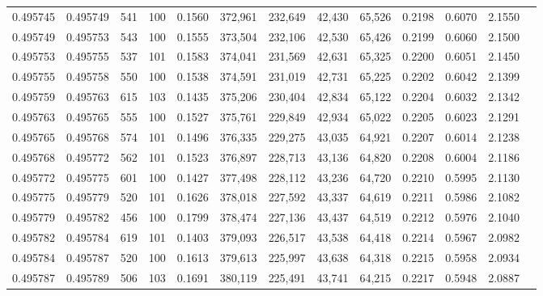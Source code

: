 \begin{tabular}{rrrrrrrrrrrrr}
0.495745 & 0.495749 &   541 & 100 &                                     0.1560 & 372,961 & 232,649 &  42,430 &  65,526 & 0.2198 & 0.6070 & 2.1550 \\
0.495749 & 0.495753 &   543 & 100 &                                     0.1555 & 373,504 & 232,106 &  42,530 &  65,426 & 0.2199 & 0.6060 & 2.1500 \\
0.495753 & 0.495755 &   537 & 101 &                                     0.1583 & 374,041 & 231,569 &  42,631 &  65,325 & 0.2200 & 0.6051 & 2.1450 \\
0.495755 & 0.495758 &   550 & 100 &                                     0.1538 & 374,591 & 231,019 &  42,731 &  65,225 & 0.2202 & 0.6042 & 2.1399 \\
0.495759 & 0.495763 &   615 & 103 &                                     0.1435 & 375,206 & 230,404 &  42,834 &  65,122 & 0.2204 & 0.6032 & 2.1342 \\
0.495763 & 0.495765 &   555 & 100 &                                     0.1527 & 375,761 & 229,849 &  42,934 &  65,022 & 0.2205 & 0.6023 & 2.1291 \\
0.495765 & 0.495768 &   574 & 101 &                                     0.1496 & 376,335 & 229,275 &  43,035 &  64,921 & 0.2207 & 0.6014 & 2.1238 \\
0.495768 & 0.495772 &   562 & 101 &                                     0.1523 & 376,897 & 228,713 &  43,136 &  64,820 & 0.2208 & 0.6004 & 2.1186 \\
0.495772 & 0.495775 &   601 & 100 &                                     0.1427 & 377,498 & 228,112 &  43,236 &  64,720 & 0.2210 & 0.5995 & 2.1130 \\
0.495775 & 0.495779 &   520 & 101 &                                     0.1626 & 378,018 & 227,592 &  43,337 &  64,619 & 0.2211 & 0.5986 & 2.1082 \\
0.495779 & 0.495782 &   456 & 100 &                                     0.1799 & 378,474 & 227,136 &  43,437 &  64,519 & 0.2212 & 0.5976 & 2.1040 \\
0.495782 & 0.495784 &   619 & 101 &                                     0.1403 & 379,093 & 226,517 &  43,538 &  64,418 & 0.2214 & 0.5967 & 2.0982 \\
0.495784 & 0.495787 &   520 & 100 &                                     0.1613 & 379,613 & 225,997 &  43,638 &  64,318 & 0.2215 & 0.5958 & 2.0934 \\
0.495787 & 0.495789 &   506 & 103 &                                     0.1691 & 380,119 & 225,491 &  43,741 &  64,215 & 0.2217 & 0.5948 & 2.0887 \\

\end{tabular}
